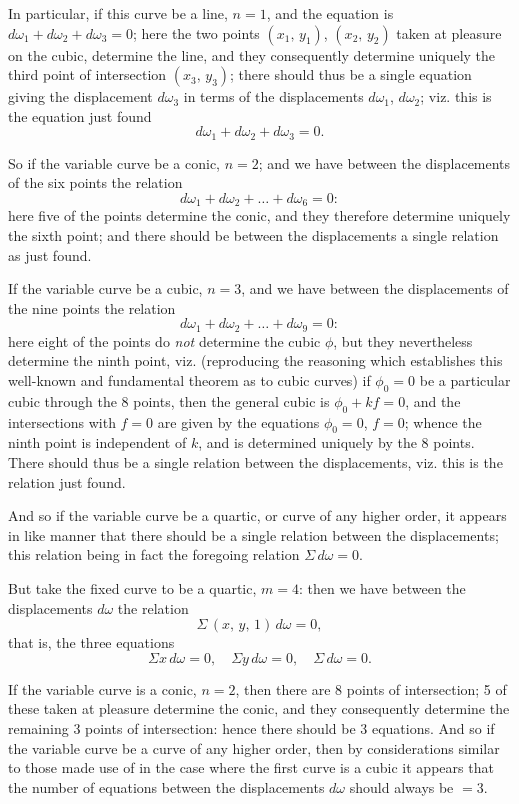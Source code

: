 \documentclass[11pt,a4paper]{article}
\theoremstyle{plain}
\theoremstyle{definition}
\theoremstyle{remark}
\begin{document}
In particular, if this curve be a line, $n=1$, and the equation is $d\omega_1 + d\omega_2 + d\omega_3 = 0$; here the two points $(x_1,\,y_1)$, $(x_2,\,y_2)$ taken at pleasure on the cubic, determine the line, and they consequently determine uniquely the third point of intersection $(x_3,\,y_3)$; there should thus be a single equation giving the displacement $d\omega_3$ in terms of the displacements $d\omega_1$, $d\omega_2$; viz. this is the equation just found
\[
d\omega_1 + d\omega_2 + d\omega_3 = 0.
\]

So if the variable curve be a conic, $n=2$; and we have between the displacements of the six points the relation
\[
d\omega_1 + d\omega_2 + \ldots + d\omega_6 = 0:
\]
here five of the points determine the conic, and they therefore determine uniquely the sixth point; and there should be between the displacements a single relation as just found.

If the variable curve be a cubic, $n=3$, and we have between the displacements of the nine points the relation
\[
d\omega_1 + d\omega_2 + \ldots + d\omega_9 = 0:
\]
here eight of the points do \emph{not} determine the cubic $\phi$, but they nevertheless determine the ninth point, viz. (reproducing the reasoning which establishes this well-known and fundamental theorem as to cubic curves) if $\phi_0 = 0$ be a particular cubic through the 8 points, then the general cubic is $\phi_0 + kf = 0$, and the intersections with $f=0$ are given by the equations $\phi_0=0$, $f=0$; whence the ninth point is independent of $k$, and is determined uniquely by the 8 points. There should thus be a single relation between the displacements, viz. this is the relation just found.

And so if the variable curve be a quartic, or curve of any higher order, it appears in like manner that there should be a single relation between the displacements; this relation being in fact the foregoing relation $\Sigma\,d\omega = 0$.

But take the fixed curve to be a quartic, $m=4$: then we have between the displacements $d\omega$ the relation
\[
\Sigma\,(x,\,y,\,1)\,d\omega = 0,
\]
that is, the three equations
\[
\Sigma x\,d\omega = 0,\quad \Sigma y\,d\omega = 0,\quad \Sigma\,d\omega = 0.
\]

If the variable curve is a conic, $n=2$, then there are 8 points of intersection; 5 of these taken at pleasure determine the conic, and they consequently determine the remaining 3 points of intersection: hence there should be 3 equations. And so if the variable curve be a curve of any higher order, then by considerations similar to those made use of in the case where the first curve is a cubic it appears that the number of equations between the displacements $d\omega$ should always be $=3$.
\end{document}
